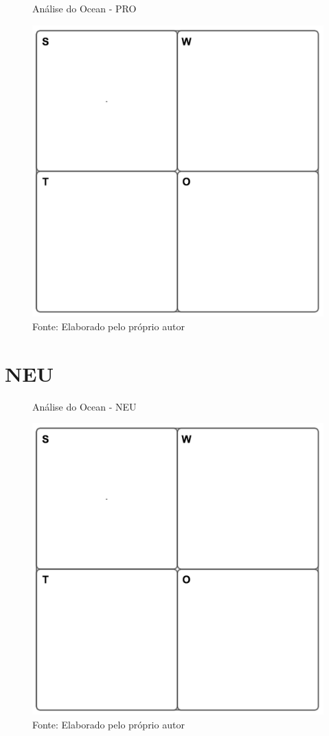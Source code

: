 \begin{figure}[H]
\caption{Análise do Ocean - PRO}
\centerline{\includegraphics[scale=0.75]{img/generalswot}}
\label{fig:swotpro}
\caption* {Fonte: Elaborado pelo próprio autor}
\end{figure}

\section{NEU}

\begin{figure}[H]
\caption{Análise do Ocean - NEU}
\centerline{\includegraphics[scale=0.75]{img/generalswot}}
\label{fig:swotneu}
\caption* {Fonte: Elaborado pelo próprio autor}
\end{figure}

